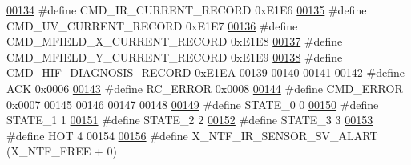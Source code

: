 \begin{DoxyCode}
\hypertarget{a00021_source_l00134}{}\hyperlink{a00021_a4dcce4fd3ff29eb6782f3228901f99cf}{00134} \textcolor{preprocessor}{#define CMD\_IR\_CURRENT\_RECORD                                   0xE1E6}
\hypertarget{a00021_source_l00135}{}\hyperlink{a00021_ab0e0364ddc2d95d1e5b51a3e3ff50918}{00135} \textcolor{preprocessor}{#define CMD\_UV\_CURRENT\_RECORD                                   0xE1E7}
\hypertarget{a00021_source_l00136}{}\hyperlink{a00021_ab796345ffdbc6a240b67b56583bb77c6}{00136} \textcolor{preprocessor}{#define CMD\_MFIELD\_X\_CURRENT\_RECORD                             0xE1E8}
\hypertarget{a00021_source_l00137}{}\hyperlink{a00021_a8ddac7f7a2a90f2d8535af02e338b1bf}{00137} \textcolor{preprocessor}{#define CMD\_MFIELD\_Y\_CURRENT\_RECORD                             0xE1E9}
\hypertarget{a00021_source_l00138}{}\hyperlink{a00021_a185ed5442d69c7c8abba13323a8e8187}{00138} \textcolor{preprocessor}{#define CMD\_HIF\_DIAGNOSIS\_RECORD                                0xE1EA}
00139 
00140 
00141 
\hypertarget{a00021_source_l00142}{}\hyperlink{a00021_a6f6489887e08bff4887d0bc5dcf214d8}{00142} \textcolor{preprocessor}{#define ACK                                                     0x0006}
\hypertarget{a00021_source_l00143}{}\hyperlink{a00021_a993a04d3d34ab3326d1786c66e3aaa1a}{00143} \textcolor{preprocessor}{#define RC\_ERROR                                                0x0008}
\hypertarget{a00021_source_l00144}{}\hyperlink{a00021_a1764a522e9c1a59a59be8757c69fa494}{00144} \textcolor{preprocessor}{#define CMD\_ERROR                                               0x0007}
00145 
00146 
00147 
00148 
\hypertarget{a00021_source_l00149}{}\hyperlink{a00021_ad6739dbbe5581cac99b7dc8a5e09949c}{00149} \textcolor{preprocessor}{#define STATE\_0                                                 0}
\hypertarget{a00021_source_l00150}{}\hyperlink{a00021_a727351838367f27ac0adb9a13422c342}{00150} \textcolor{preprocessor}{#define STATE\_1                                                 1}
\hypertarget{a00021_source_l00151}{}\hyperlink{a00021_a66fa48e832a64af4d405511cecc4c752}{00151} \textcolor{preprocessor}{#define STATE\_2                                                 2}
\hypertarget{a00021_source_l00152}{}\hyperlink{a00021_ad87f1bc8466a25d9f7da68717d324a22}{00152} \textcolor{preprocessor}{#define STATE\_3                                                 3}
\hypertarget{a00021_source_l00153}{}\hyperlink{a00021_a1eb14cc432874ddacd1934791dbe12a3}{00153} \textcolor{preprocessor}{#define HOT                                                     4}
00154 
\hypertarget{a00021_source_l00156}{}\hyperlink{a00021_a0eb06525326cff5fc0fb38f141d6be8e}{00156} \textcolor{preprocessor}{#define X\_NTF\_IR\_SENSOR\_SV\_ALART                        (X\_NTF\_FREE + 0)}

\end{DoxyCode}
